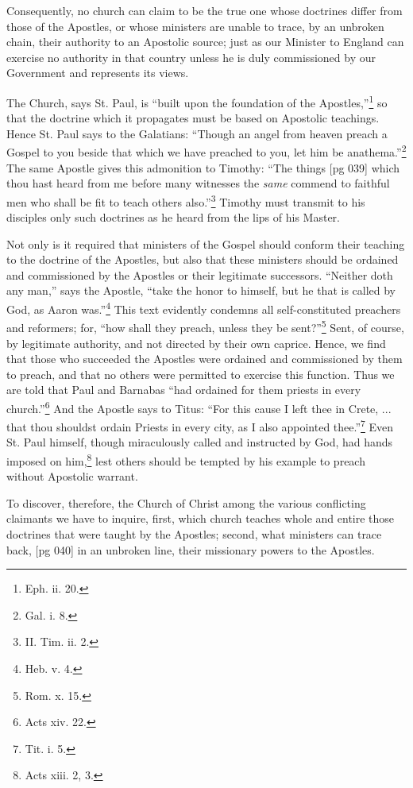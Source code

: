Consequently, no church can claim to be the true
one whose doctrines differ from those of the Apostles,
or whose ministers are unable to trace, by an
unbroken chain, their authority to an Apostolic
source; just as our Minister to England can exercise
no authority in that country unless he is duly
commissioned by our Government and represents
its views.

The Church, says St. Paul, is “built upon the
foundation of the Apostles,”\footnote{Eph.
ii. 20.} so that the doctrine
which it propagates must be based on Apostolic
teachings. Hence St. Paul says to the Galatians:
“Though an angel from heaven preach a
Gospel to you beside that which we have preached
to you, let him be anathema.”\footnote{Gal.
i. 8.} The same Apostle
gives this admonition to Timothy: “The things
[pg 039]
which thou hast heard from me before many witnesses
the \emph{same} commend to faithful men who
shall be fit to teach others also.”\footnote{II.
Tim. ii. 2.} Timothy must
transmit to his disciples only such doctrines as
he heard from the lips of his Master.

Not only is it required that ministers of the
Gospel should conform their teaching to the doctrine
of the Apostles, but also that these ministers
should be ordained and commissioned by the
Apostles or their legitimate successors. “Neither
doth any man,” says the Apostle, “take the honor
to himself, but he that is called by God, as Aaron
was.”\footnote{Heb. v.
4.} This text evidently condemns all self-constituted
preachers and reformers; for, “how
shall they preach, unless they be sent?”\footnote{Rom.
x. 15.} Sent,
of course, by legitimate authority, and not directed
by their own caprice. Hence, we find that
those who succeeded the Apostles were ordained
and commissioned by them to preach, and that no
others were permitted to exercise this function.
Thus we are told that Paul and Barnabas “had
ordained for them priests in every church.”\footnote{Acts xiv. 22.}
And the Apostle says to Titus: “For this cause
I left thee in Crete, ... that thou shouldst ordain
Priests in every city, as I also appointed
thee.”\footnote{Tit. i.
5.} Even St. Paul himself, though miraculously
called and instructed by God, had hands
imposed on him,\footnote{Acts xiii.
2, 3.} lest others should be tempted
by his example to preach without Apostolic warrant.

To discover, therefore, the Church of Christ
among the various conflicting claimants we have
to inquire, first, which church teaches whole and
entire those doctrines that were taught by the
Apostles; second, what ministers can trace back,
[pg 040]
in an unbroken line, their missionary powers to
the Apostles.

